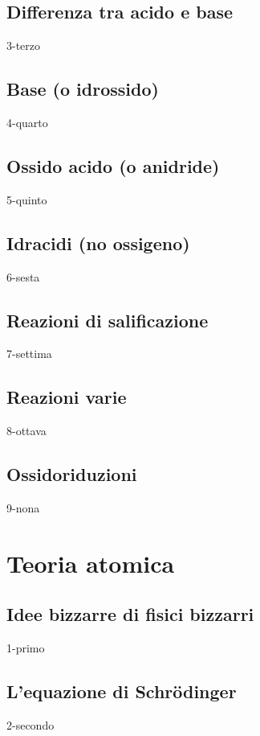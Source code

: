 \documentclass[openany,12pt]{book}%
\begin{document}
  \section{Differenza tra acido e base}
    {3-terzo}

  \section{Base (o idrossido)}
    {4-quarto}

  \section{Ossido acido (o anidride)}
    {5-quinto}

  \section{Idracidi (no ossigeno)}
    {6-sesta}

  \section{Reazioni di salificazione}
    {7-settima}

  \section{Reazioni varie}
    {8-ottava}

  \section{Ossidoriduzioni}
    {9-nona}

\chapter{Teoria atomica}

  \section{Idee bizzarre di fisici bizzarri}
    {1-primo}

    \section{L'equazione di Schrödinger}
    {2-secondo}
\end{document}
